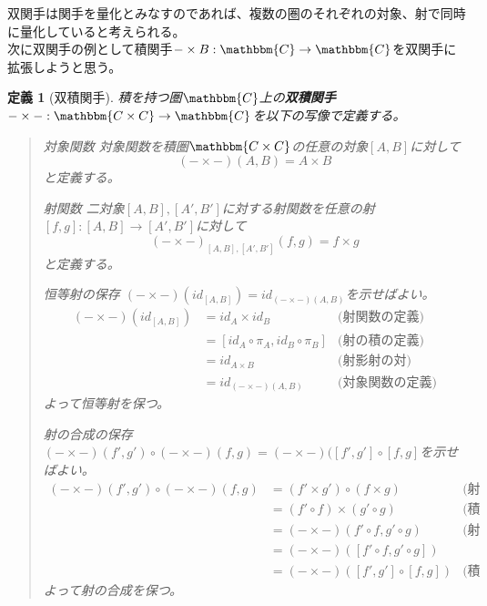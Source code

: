 \documentclass[uplatex,dvipdfmx]{jsarticle}
\newcommand{\cat}[1]{\mathbbm{#1}}
\newcommand{\arrow}{\rightarrow}
\newcommand{\functor}[3]{#1:\cat{#2}\arrow \cat{#3}}
\newcommand{\mor}[3]{#1:#2\arrow #3}
\newcommand{\pcobj}[1]{[#1]}
\newtheorem{define}[proof]{定義}
\numberwithin{proof}{subsection}
\newenvironment{mydescription}
{\begin{description}
  \setlength{\parskip}{0.5cm}
}
{\end{description}}
\begin{document}
  双関手は関手を量化とみなすのであれば、複数の圏のそれぞれの対象、射で同時に量化していると考えられる。\\
	次に双関手の例として積関手$\functor{-\times B}{C}{C}$を双関手に拡張しようと思う。
	\begin{define}[双積関手]
		積を持つ圏$\cat{C}$上の\textbf{双積関手}$\functor{-\times -}{C\times C}{C}$を以下の写像で定義する。
		\begin{quote}
			\begin{mydescription}
				\item[対象関数] 対象関数を積圏$\cat{C\times C}$の任意の対象$\pcobj{A,B}$に対して\[(-\times -)(A,B)=A\times B\]と定義する。
				\item[射関数] 二対象$\pcobj{A,B},\pcobj{A',B'}$に対する射関数を任意の射$\mor{\pcobj{f,g}}{\pcobj{A,B}}{\pcobj{A',B'}}$に対して\[(-\times -)_{\pcobj{A,B},\pcobj{A',B'}}(f,g)=f\times g\]と定義する。
				\begin{center}
				\end{center}

				\item[恒等射の保存] $(-\times -)(id_{\pcobj{A,B}})=id_{(-\times-)(A,B)}$を示せばよい。
				\begin{align*}
					(-\times -)(id_{\pcobj{A,B}})&=id_A\times id_B&\text{(射関数の定義)}\\
					&=\pcobj{id_A\circ\pi_A,id_B\circ\pi_B}&\text{(射の積の定義)}\\
					&=id_{A\times B}&\text{(射影射の対)}\\
					&=id_{(-\times-)(A,B)}&\text{(対象関数の定義)}
				\end{align*}
				よって恒等射を保つ。
				\item[射の合成の保存] $(-\times -)(f',g')\circ(-\times-)(f,g)=(-\times-)(\pcobj{f',g'}\circ\pcobj{f,g}$を示せばよい。
				\begin{align*}
					(-\times -)(f',g')\circ(-\times-)(f,g)&=(f'\times g')\circ(f\times g)&\text{(射関数の定義)}\\
					&=(f'\circ f)\times(g'\circ g)&\text{(積と合成の交換)}\\
					&=(-\times-)(f'\circ f,g'\circ g)&\text{(射関数の定義)}\\
					&=(-\times-)(\pcobj{f'\circ f,g'\circ g})\\
					&=(-\times-)(\pcobj{f',g'}\circ\pcobj{f,g})&\text{(積圏の射の合成の定義)}
				\end{align*}
				よって射の合成を保つ。
			\end{mydescription}
		\end{quote}
	\end{define}
\end{document}
